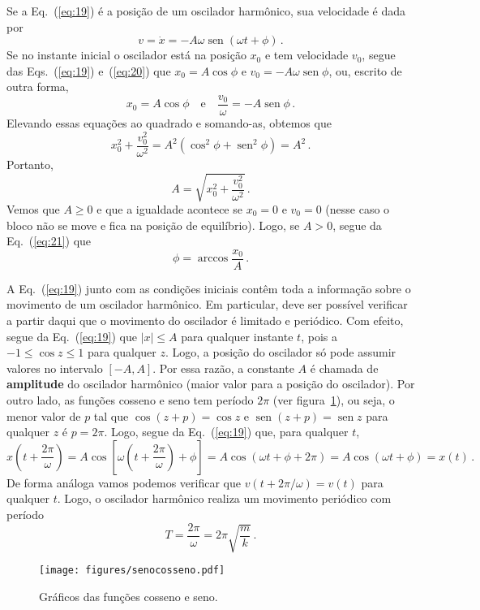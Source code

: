 \documentclass[12pt,a4paper]{article}
\newcommand{\dpar}[1]{\left(#1\right)}
\newcommand{\dsqr}[1]{\left[#1\right]}
\theoremstyle{definition}
\DeclareMathOperator{\sen}{sen}
\begin{document}
Se a Eq.~(\ref{eq:19}) é a posição de um oscilador harmônico, sua
velocidade é dada por
\begin{equation}
  \label{eq:20}
  v=\dot x=-A\omega\sen(\omega t+\phi)\,.
\end{equation}
Se no instante inicial o oscilador está na posição $x_0$ e tem
velocidade $v_0$, segue das Eqs.~(\ref{eq:19}) e~(\ref{eq:20}) que $x_0=A\cos\phi$ e $v_0=-A\omega\sen\phi$,
ou, escrito de outra forma,
\begin{equation}
  \label{eq:21}
  x_0=A\cos\phi\quad\text{e}\quad \frac{v_0}{\omega}=-A\sen\phi\,.
\end{equation}
Elevando essas equações ao quadrado e somando-as, obtemos que
$$x_0^2+\frac{v_0^2}{\omega^2}=A^2(\cos^2\phi+\sen^2\phi)=A^2\,.$$
Portanto,
\begin{equation}
  \label{eq:22}
  A=\sqrt{x_0^2+\frac{v_0^2}{\omega^2}}\,.
\end{equation}
Vemos que $A\ge 0$ e que a igualdade acontece se $x_0=0$ e $v_0=0$
(nesse caso o bloco não se move e fica na posição de
equilíbrio). Logo, se $A>0$, segue da Eq.~(\ref{eq:21}) que
\begin{equation}
  \label{eq:23}
  \phi=\arccos\frac{x_0}{A}\,.
\end{equation}

A Eq.~(\ref{eq:19}) junto com as condições iniciais contêm toda a
informação sobre o movimento de um oscilador harmônico. Em particular,
deve ser possível verificar a partir daqui que o movimento do
oscilador é limitado e periódico. Com efeito, segue da
Eq.~(\ref{eq:19}) que $|x|\le A$ para qualquer instante $t$, pois a
$-1\le \cos z\le 1$ para qualquer $z$. Logo, a posição do oscilador só
pode assumir valores no intervalo $[-A,A]$. Por essa razão, a
constante $A$ é chamada de \textbf{amplitude} do oscilador harmônico
(maior valor para a posição do oscilador). Por outro lado, as funções
cosseno e seno tem período $2\pi$ (ver figura~\ref{fig:senocosseno}),
ou seja, o menor valor de $p$ tal que $\cos(z+p)=\cos z$ e
$\sen(z+p)=\sen z$ para qualquer $z$ é $p=2\pi$. Logo, segue da
Eq.~(\ref{eq:19}) que, para qualquer $t$,
$$x\dpar{t+\frac{2\pi}{\omega}}=A\cos\dsqr{\omega\dpar{t+\frac{2\pi}{\omega}}+\phi}=A\cos(\omega t+\phi+2\pi)=A\cos(\omega t+\phi)=x(t)\,.$$
De forma análoga vamos podemos verificar que $v(t+2\pi/\omega)=v(t)$
para qualquer $t$. Logo, o oscilador harmônico realiza um movimento
periódico com período
\begin{equation}
  \label{eq:24}
  T=\frac{2\pi}{\omega}=2\pi\sqrt{\frac{m}{k}}\,.
\end{equation}
\begin{figure}[t]
  \centering
  \texttt{[image: figures/senocosseno.pdf]}
  \caption{Gráficos das funções cosseno e seno.}
  \label{fig:senocosseno}
\end{figure}
\end{document}
